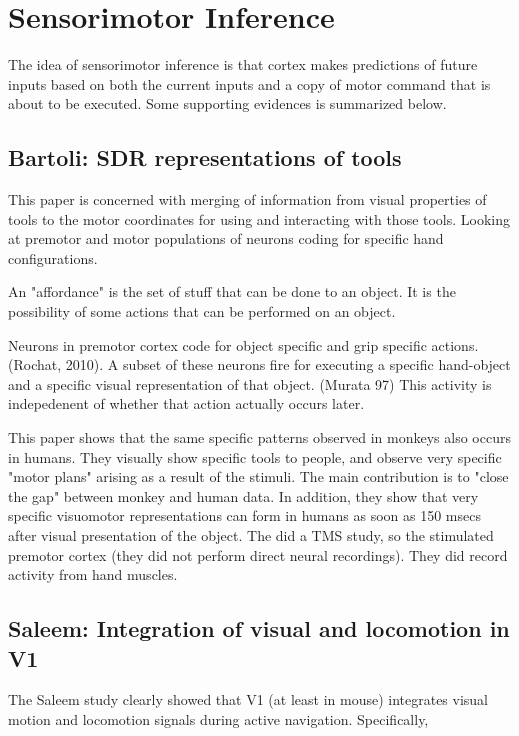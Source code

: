 \documentclass{article} %
\begin{document}
\section{Sensorimotor Inference}

The idea of sensorimotor inference is that cortex makes predictions of future
inputs based on both the current inputs and a copy of motor command that is
about to be executed.  Some supporting evidences is summarized below.

\subsection{Bartoli: SDR representations of tools}

This paper \cite{Bartoli2014} is concerned with merging of information from
visual properties of tools to the motor coordinates for using and interacting
with those tools. Looking at premotor and motor populations of neurons coding
for specific hand configurations.

An "affordance" is the set of stuff that can be done to an object.  It is the
possibility of some actions that can be performed on an object.

Neurons in premotor cortex code for object specific and grip specific actions.
(Rochat, 2010). A subset of these neurons fire for executing a specific
hand-object and a specific visual representation of that object. (Murata 97)
This activity is indepedenent of whether that action actually occurs later.

This paper shows that the same specific patterns observed in monkeys also occurs
in humans.  They visually show specific tools to people, and observe very
specific "motor plans" arising as a result of the stimuli. The main contribution
is to "close the gap" between monkey and human data. In addition, they show that
very specific visuomotor representations can form in humans as soon as 150 msecs
after visual presentation of the object.  The did a TMS study, so the stimulated
premotor cortex (they did not perform direct neural recordings).  They did
record activity from hand muscles.

\subsection{Saleem: Integration of visual and locomotion in V1}

The Saleem study \cite{Saleem2013} clearly showed that V1 (at least in mouse) 
integrates visual motion and locomotion signals during active navigation. Specifically,
\end{document}
